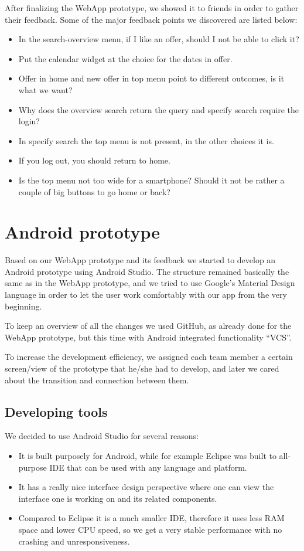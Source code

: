 \documentclass[11pt,twoside,a4paper]{report}
\begin{document}
After finalizing the WebApp prototype, we showed it to friends in order to gather their feedback. Some of the major feedback points we discovered are listed below:

\begin{itemize}
\item In the search-overview menu, if I like an offer, should I not be able to click it?
\item Put the calendar widget at the choice for the dates in offer.
\item Offer in home and new offer in top menu point to different outcomes, is it what we want?
\item Why does the overview search return the query and specify search require the login?
\item In specify search the top menu is not present, in the other choices it is.
\item If you log out, you should return to home.
\item Is the top menu not too wide for a smartphone? Should it not be rather a couple of big buttons to go home or back?
\end{itemize}

\chapter{Android prototype}

Based on our WebApp prototype and its feedback we started to develop an Android prototype using Android Studio. The structure remained basically the same as in the WebApp prototype, and we tried to use Google's Material Design language \cite{google} in order to let the user work comfortably with our app from the very beginning.

To keep an overview of all the changes we used GitHub, as already done for the WebApp prototype, but this time with Android integrated functionality ``VCS''.

To increase the development efficiency, we assigned each team member a certain screen/view of the prototype that he/she had to develop, and later we cared about the transition and connection between them.

\section{Developing tools}

We decided to use Android Studio for several reasons:

\begin{itemize}
\item It is built purposely for Android, while for example Eclipse was built to all-purpose IDE that can be used with any language and platform.
\item It has a really nice interface design perspective where one can view the interface one is working on and its related components.
\item Compared to Eclipse it is a much smaller IDE, therefore it uses less RAM space and lower CPU speed, so we get a very stable performance with no crashing and unresponsiveness.
\end{itemize}
\end{document}
